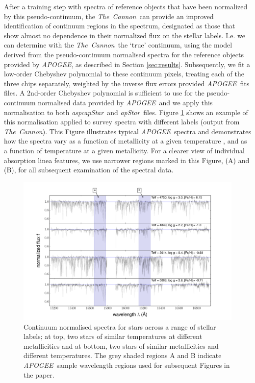 \documentclass[12pt, preprint]{aastex}
\newcommand{\tc}{\textsl{The~Cannon}}
\newcommand{\apogee}{\textsl{APOGEE}}
\newcommand{\aspcapstar}{\textsl{aspcapStar}}
\newcommand{\apstar}{\textsl{apStar}}
\begin{document}
After a training step with spectra of reference objects that have been  normalized  by this pseudo-continuum,
 the \tc\ can provide an improved identification of continuum regions in the spectrum,
designated as those that show almost no dependence in their normalized flux on the stellar labels.
I.e. we can determine with the \tc\ the `true' continuum, using the model derived from the pseudo-continuum normalised spectra for the reference objects provided by \apogee, as described in Section \ref{sec:results}. Subsequently, we fit a low-order Chebyshev polynomial to these continuum pixels,
 treating each of the three chips separately, weighted by the inverse flux errors provided \apogee\ fits files. A 2nd-order Chebyshev polynomial is sufficient to use for the pseudo-continuum normalised data provided by \apogee\ and we apply this normalisation to both \aspcapstar\ and  \apstar\ files. 
Figure \ref{fig:norm} shows an example of this normalisation applied to survey spectra with different labels (output from \tc). 
This Figure illustrates typical \apogee\ spectra and demonstrates how the spectra 
vary as a function of metallicity at a given temperature , and as a function of temperature at a given metallicity. 
For a clearer view of individual absorption linea features, we use narrower regions marked in this Figure, (A) and (B), for all subsequent examination of the spectral data. 


\begin{figure}[h!]
  \includegraphics[width=\hsize]{./plots/four_examples3.pdf}
\caption{Continuum normalised spectra for stars across a range of stellar labels; at top, two stars of similar temperatures at different metallicities and at bottom, two stars of similar metallicities and different temperatures. The grey shaded regions A and B indicate \apogee\ sample wavelength regions used for subsequent Figures in the paper.}
\label{fig:norm}
\end{figure}
\end{document}
